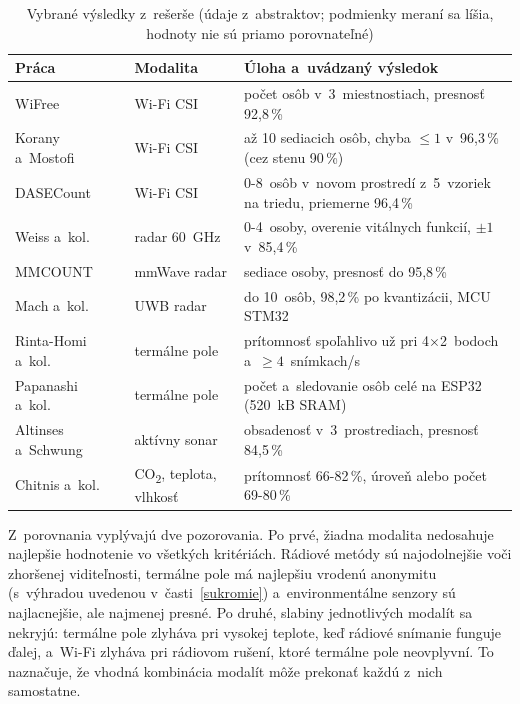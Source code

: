 \documentclass[10pt,twoside,a4paper]{article}
\begin{document}
\begin{table}[t]
\centering
\caption{Vybrané výsledky z~rešerše (údaje z~abstraktov; podmienky meraní sa líšia, hodnoty nie sú priamo porovnateľné)}\label{tab:vysledky}
\small
\begin{tabularx}{\textwidth}{@{}llX@{}}
\toprule
Práca & Modalita & Úloha a~uvádzaný výsledok \\
\midrule
WiFree~\cite{zou2018wifree} & Wi-Fi CSI & počet osôb v~3~miestnostiach, presnosť 92,8\,\% \\
Korany a~Mostofi~\cite{korany2021stationary} & Wi-Fi CSI & až 10 sediacich osôb, chyba $\le 1$ v~96,3\,\% (cez stenu 90\,\%) \\
DASECount~\cite{hou2023dasecount} & Wi-Fi CSI & 0-8~osôb v~novom prostredí z~5~vzoriek na triedu, priemerne 96,4\,\% \\
Weiss a~kol.~\cite{weiss2020people} & radar 60~GHz & 0-4~osoby, overenie vitálnych funkcií, $\pm 1$ v~85,4\,\% \\
MMCOUNT~\cite{hu2024mmcount} & mmWave radar & sediace osoby, presnosť do 95,8\,\% \\
Mach a~kol.~\cite{mach2024uwb} & UWB radar & do 10~osôb, 98,2\,\% po kvantizácii, MCU STM32 \\
Rinta-Homi a~kol.~\cite{rintahomi2021howlow} & termálne pole & prítomnosť spoľahlivo už pri 4$\times$2~bodoch a~$\ge 4$~snímkach/s \\
Papanashi a~kol.~\cite{papanashi2026thermal} & termálne pole & počet a~sledovanie osôb celé na ESP32 (520~kB SRAM) \\
Altinses a~Schwung~\cite{altinses2026sonar} & aktívny sonar & obsadenosť v~3~prostrediach, presnosť 84,5\,\% \\
Chitnis a~kol.~\cite{chitnis2025environmental} & CO\textsubscript{2}, teplota, vlhkosť & prítomnosť 66-82\,\%, úroveň alebo počet 69-80\,\% \\
\bottomrule
\end{tabularx}
\end{table}

Z~porovnania vyplývajú dve pozorovania. Po prvé, žiadna modalita nedosahuje najlepšie hodnotenie vo všetkých kritériách. Rádiové metódy sú najodolnejšie voči zhoršenej viditeľnosti, termálne pole má najlepšiu vrodenú anonymitu (s~výhradou uvedenou v~časti~\ref{sukromie}) a~environmentálne senzory sú najlacnejšie, ale najmenej presné. Po druhé, slabiny jednotlivých modalít sa nekryjú: termálne pole zlyháva pri vysokej teplote, keď rádiové snímanie funguje ďalej, a~Wi-Fi zlyháva pri rádiovom rušení, ktoré termálne pole neovplyvní. To naznačuje, že vhodná kombinácia modalít môže prekonať každú z~nich samostatne.
\end{document}
